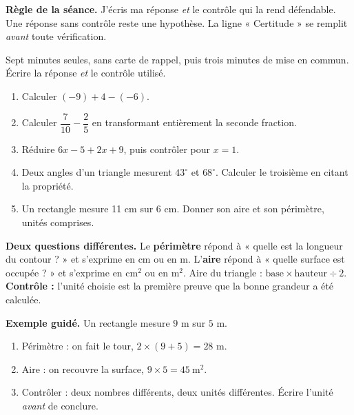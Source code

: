\documentclass[10pt,a4paper]{article}
\begin{document}
\begin{graybox}\small\textbf{Règle de la séance.} J'écris ma réponse \emph{et} le contrôle qui la rend défendable. Une réponse sans contrôle reste une hypothèse. La ligne « Certitude » se remplit \emph{avant} toute vérification.\end{graybox}
\par\vspace{2mm}
Sept minutes seules, sans carte de rappel, puis trois minutes de mise en commun. Écrire la réponse \emph{et} le contrôle utilisé.
\begin{enumerate}
\item Calculer $(-9) + 4 - (-6)$.
\item Calculer $\dfrac{7}{10} - \dfrac{2}{5}$ en transformant entièrement la seconde fraction.
\item Réduire $6x - 5 + 2x + 9$, puis contrôler pour $x = 1$.
\item Deux angles d'un triangle mesurent $43^\circ$ et $68^\circ$. Calculer le troisième en citant la propriété.
\item Un rectangle mesure 11 cm sur 6 cm. Donner son aire et son périmètre, unités comprises.
\end{enumerate}
\certline
\aideline
\needspace{62mm}\par\vspace{3mm}
\begin{methodbox}
\textbf{Deux questions différentes.} Le \textbf{périmètre} répond à « quelle est la longueur du contour ? »
et s'exprime en cm ou en m. L'\textbf{aire} répond à « quelle surface est occupée ? » et s'exprime en
$\text{cm}^2$ ou en $\text{m}^2$. Aire du triangle : $\text{base}\times\text{hauteur}\div 2$.
\textbf{Contrôle :} l'unité choisie est la première preuve que la bonne grandeur a été calculée.
\end{methodbox}
\begin{graybox}
\textbf{Exemple guidé.} Un rectangle mesure $9$ m sur $5$ m.
\begin{enumerate}
\item Périmètre : on fait le tour, $2\times(9+5)=28$ m.
\item Aire : on recouvre la surface, $9\times 5=45\ \text{m}^2$.
\item Contrôler : deux nombres différents, deux unités différentes. Écrire l'unité \emph{avant} de conclure.
\end{enumerate}
\end{graybox}
\end{document}
